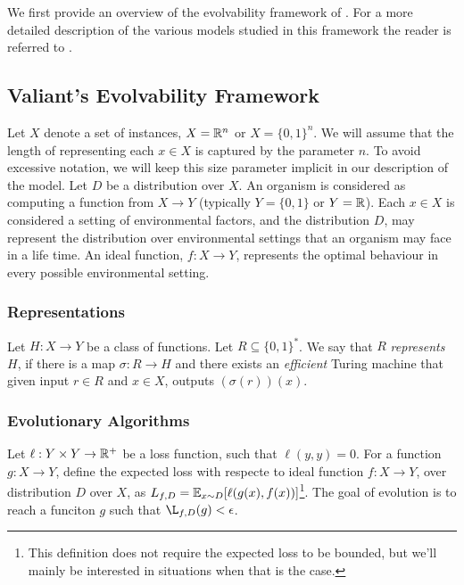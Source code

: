 We first provide an overview of the evolvability framework of
\citet{Valiant:2009}. For a more detailed description of the various models
studied in this framework the reader is referred to \cite{Kanade:2012}.

\subsection{Valiant's Evolvability Framework}

Let $X$ denote a set of instances, \eg $X = \mathbb{R}^n$ or $X = \{0, 1\}^n$. We
will assume that the length of representing each $x \in X$ is captured by the
parameter $n$. To avoid excessive notation, we will keep this size parameter
implicit in our description of the model. Let $D$ be a distribution over $X$. An
organism is considered as computing a function from $X \rightarrow Y$ (typically
$Y = \{0, 1\}$ or $Y = \mathbb{R}$). Each $x \in X$ is considered a setting of
environmental factors, and the distribution $D$, may represent the distribution
over environmental settings that an organism may face in a life time. An ideal
function, $f : X \rightarrow Y$, represents the optimal behaviour in every
possible environmental setting.

\subsubsection*{Representations}

Let $H : X \rightarrow Y$ be a class of functions. Let $R \subseteq \{0, 1\}^*$.
We say that $R$ \emph{represents} $H$, if there is a map $\sigma : R \rightarrow
H$ and there exists an \emph{efficient} Turing machine that given input $r \in
R$ and $x \in X$, outputs $(\sigma(r))(x)$. 

\subsubsection*{Evolutionary Algorithms}

Let $\ell : Y \times Y \rightarrow \mathbb{R}^+$ be a loss function, such that
$\ell(y, y) = 0$. For a function $g : X \rightarrow Y$, define the expected loss
with respecte to ideal function $f : X \rightarrow Y$, over distribution $D$
over $X$, as $L_{f, D} = \mathbb{E}_{x \sim D}[\ell(g(x), f(x))]$\footnote{This definition
does not require the expected loss to be bounded, but we'll mainly be interested
in situations when that is the case.}. The goal of evolution is to reach a
funciton $g$ such that $\L_{f, D}(g) < \epsilon$.

